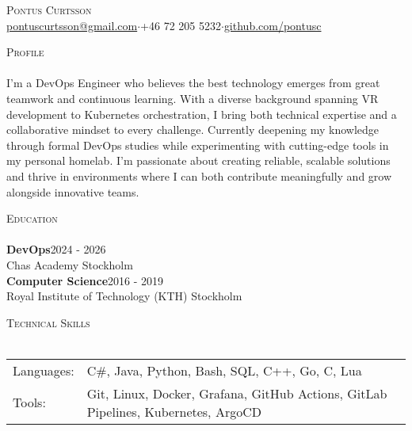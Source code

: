 \documentclass[a4paper]{article}
\newcommand{\lineunder} {
    \vspace*{-8pt} \\
    \hspace*{-18pt} \hrulefill \\
}
\newcommand{\header} [1] {
    {\hspace*{-18pt}\vspace*{6pt} \textsc{#1}}
    \vspace*{-6pt} \lineunder
}
\begin{document}
\vspace*{-40pt}

    

\vspace*{-10pt}

\begin{center}
	{\Huge \scshape {Pontus Curtsson}}\\
    \vspace{2mm}
	\href{mailto:pontuscurtsson@gmail.com}{pontuscurtsson@gmail.com}\hspace{3mm}$\cdot$\hspace{3mm}+46 72 205 5232\hspace{3mm}$\cdot$\hspace{3mm}\href{https://github.com/pontusc}{github.com/pontusc}\\
\end{center}
\vspace{2mm}

\header{Profile}
\vspace{4mm}
I'm a DevOps Engineer who believes the best technology emerges from great teamwork and continuous learning. With a diverse background spanning VR development to Kubernetes orchestration, I bring both technical expertise and a collaborative mindset to every challenge. Currently deepening my knowledge through formal DevOps studies while experimenting with cutting-edge tools in my personal homelab. 
\newline
\newline
I'm passionate about creating reliable, scalable solutions and thrive in environments where I can both contribute meaningfully and grow alongside innovative teams.
\vspace{8mm}

\header{Education}
\vspace{4mm}
\textbf{DevOps}\hfill 2024 - 2026\\
Chas Academy \hfill Stockholm\\
\vspace{4mm}
\textbf{Computer Science}\hfill 2016 - 2019\\
Royal Institute of Technology (KTH) \hfill Stockholm\\
\vspace{8mm}


\header{Technical Skills}
\vspace{4mm}
\begin{tabular}{ l l }
	Languages: & C\#, Java, Python, Bash, SQL, C++, Go, C, Lua\\[1mm]
	Tools:     & Git, Linux, Docker, Grafana, GitHub Actions, GitLab Pipelines, Kubernetes, ArgoCD\\
\end{tabular}
\vspace{8mm}
\end{document}
